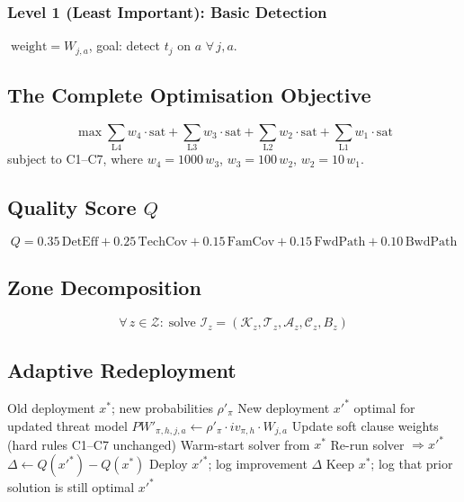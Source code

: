 \documentclass[journal]{IEEEtran}
\newcommand{\calK}{\mathcal{K}}
\newcommand{\calT}{\mathcal{T}}
\newcommand{\calA}{\mathcal{A}}
\newcommand{\calZ}{\mathcal{Z}}
\newcommand{\calC}{\mathcal{C}}
\begin{document}
\subsubsection{Level 1 (Least Important): Basic Detection}
$\;\text{weight} = W_{j,a}$, \;goal: detect $t_j$ on $a$
$\forall\,j,a$.

\subsection{The Complete Optimisation Objective}

\begin{equation}
\max \sum_{\text{L4}} w_4 \cdot \mathrm{sat}
   + \sum_{\text{L3}} w_3 \cdot \mathrm{sat}
   + \sum_{\text{L2}} w_2 \cdot \mathrm{sat}
   + \sum_{\text{L1}} w_1 \cdot \mathrm{sat}
\end{equation}
subject to C1--C7, where
$w_4=1000\,w_3$, $w_3=100\,w_2$, $w_2=10\,w_1$.

\subsection{Quality Score $Q$}

\begin{equation}
  Q = 0.35\,\text{DetEff} + 0.25\,\text{TechCov}
    + 0.15\,\text{FamCov} + 0.15\,\text{FwdPath}
    + 0.10\,\text{BwdPath}
\end{equation}

\subsection{Zone Decomposition}

\begin{equation}
  \forall\, z \in \calZ:\;
  \text{solve } \mathcal{I}_z = (\calK_z,\calT_z,\calA_z,\calC_z,B_z)
\end{equation}

\subsection{Adaptive Redeployment}

\begin{algorithm}[htbp]
\caption{Adaptive Redeployment When Threat Priors Change}
\label{alg:redeploy}
\begin{algorithmic}[1]
\REQUIRE Old deployment $x^*$; new probabilities $\rho'_\pi$
\ENSURE  New deployment $x'^*$ optimal for updated threat model
\STATE $PW'_{\pi,h,j,a} \leftarrow \rho'_\pi\cdot iv_{\pi,h}\cdot W_{j,a}$
\STATE Update soft clause weights (hard rules C1--C7 unchanged)
\STATE Warm-start solver from $x^*$
\STATE Re-run solver $\Rightarrow x'^*$
\STATE $\Delta \leftarrow Q(x'^*)-Q(x^*)$
  \STATE Deploy $x'^*$; log improvement $\Delta$
\ELSE
  \STATE Keep $x^*$; log that prior solution is still optimal
\ENDIF
\RETURN $x'^*$
\end{algorithmic}
\end{algorithm}
\end{document}
